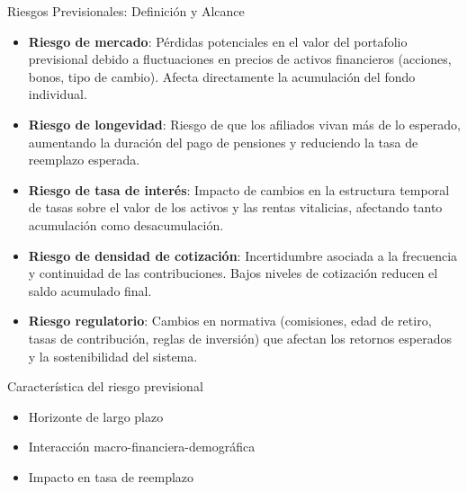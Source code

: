 \documentclass{beamer}
\begin{document}
\begin{frame}{Riesgos Previsionales: Definición y Alcance}
\footnotesize
\begin{itemize}

\item \textbf{Riesgo de mercado}: Pérdidas potenciales en el valor del portafolio previsional debido a fluctuaciones en precios de activos financieros (acciones, bonos, tipo de cambio). Afecta directamente la acumulación del fondo individual.

\vspace{0.3cm}

\item \textbf{Riesgo de longevidad}: 
Riesgo de que los afiliados vivan más de lo esperado, aumentando la duración del pago de pensiones y reduciendo la tasa de reemplazo esperada.

\vspace{0.3cm}

\item \textbf{Riesgo de tasa de interés}: 
Impacto de cambios en la estructura temporal de tasas sobre el valor de los activos y las rentas vitalicias, afectando tanto acumulación como desacumulación.

\vspace{0.3cm}

\item \textbf{Riesgo de densidad de cotización}:
Incertidumbre asociada a la frecuencia y continuidad de las contribuciones. Bajos niveles de cotización reducen el saldo acumulado final.

\vspace{0.3cm}

\item \textbf{Riesgo regulatorio}:
Cambios en normativa (comisiones, edad de retiro, tasas de contribución, reglas de inversión) que afectan los retornos esperados y la sostenibilidad del sistema.

\end{itemize}
\end{frame}

\begin{frame}[t]{Característica del riesgo previsional}
\vspace{0.5cm}
\begin{itemize}
    \item Horizonte de largo plazo
    \item Interacción macro-financiera-demográfica
    \item Impacto en tasa de reemplazo
\end{itemize}
    
\end{frame}
\end{document}
